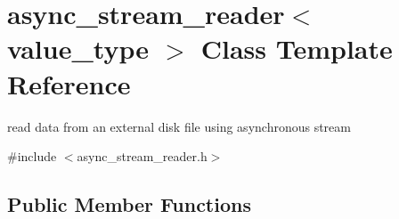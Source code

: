 \hypertarget{classasync__stream__reader}{}\section{async\+\_\+stream\+\_\+reader$<$ value\+\_\+type $>$ Class Template Reference}
\label{classasync__stream__reader}


read data from an external disk file using asynchronous stream  




{\ttfamily \#include $<$async\+\_\+stream\+\_\+reader.\+h$>$}

\subsection*{Public Member Functions}
